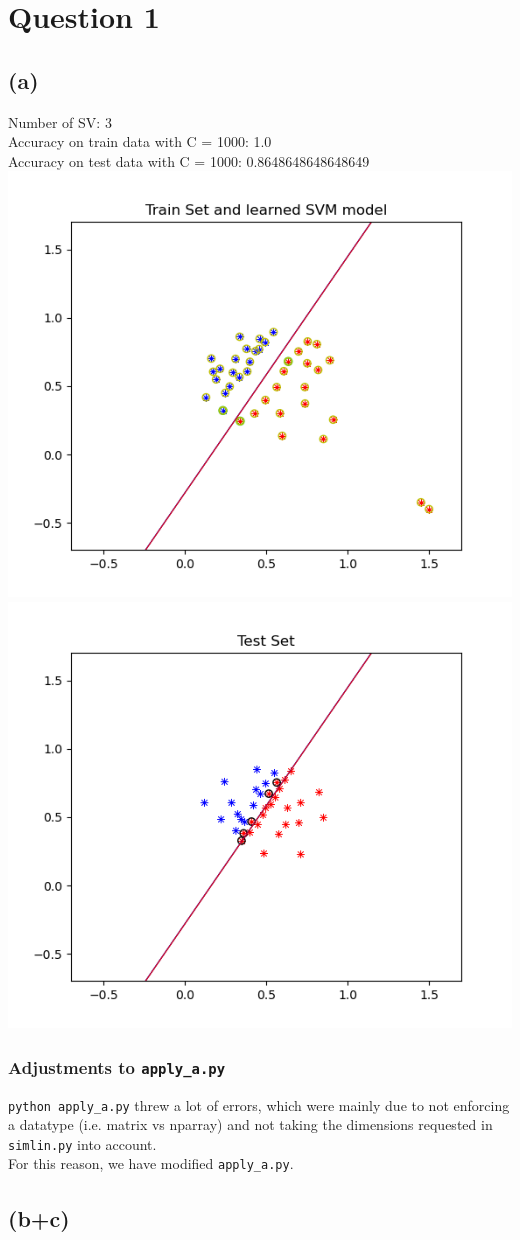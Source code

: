 \section*{Question 1}
\subsection*{(a)}
Number of SV: 3\\
Accuracy on train data with C = 1000: 1.0 \\
Accuracy on test data with C = 1000: 0.8648648648648649 \\

\includegraphics[width=.5\textwidth]{q1_svm_python/Figure_1.png}
\includegraphics[width=.5\textwidth]{q1_svm_python/Figure_2.png}

\subsubsection*{Adjustments to \texttt{apply\_a.py}}
\texttt{python apply\_a.py} threw a lot of errors, which were mainly due to not enforcing a datatype (i.e. matrix vs nparray) and not taking the dimensions requested in \texttt{simlin.py} into account.\\

For this reason, we have modified \texttt{apply\_a.py}.

\subsection*{(b+c)}
